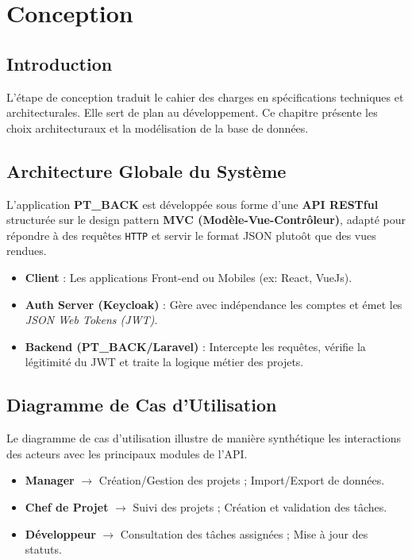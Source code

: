 \chapter{Conception}

\section{Introduction}
L'\'{e}tape de conception traduit le cahier des charges en sp\'{e}cifications techniques
et architecturales. Elle sert de plan au d\'{e}veloppement. Ce chapitre pr\'{e}sente
les choix architecturaux et la mod\'{e}lisation de la base de donn\'{e}es.

\section{Architecture Globale du Syst\`{e}me}

L'application \textbf{PT\_BACK} est d\'{e}velopp\'{e}e sous forme d'une \textbf{API RESTful} structur\'{e}e
sur le design pattern \textbf{MVC (Mod\`{e}le-Vue-Contr\^{o}leur)}, adapt\'{e} pour r\'{e}pondre
\`{a} des requ\^{e}tes \texttt{HTTP} et servir le format JSON pluto\^{o}t que des vues rendues.

\vspace{0.4cm}
\begin{itemize}[leftmargin=*]
    \item \textbf{Client} : Les applications Front-end ou Mobiles (ex: React, VueJs).
    \item \textbf{Auth Server (Keycloak)} : G\`{e}re avec ind\'{e}pendance les comptes
    et \'{e}met les \textit{JSON Web Tokens (JWT)}.
    \item \textbf{Backend (PT\_BACK/Laravel)} : Intercepte les requ\^{e}tes, v\'{e}rifie
    la l\'{e}gitimit\'{e} du JWT et traite la logique m\'{e}tier des projets.
\end{itemize}

\section{Diagramme de Cas d'Utilisation}

Le diagramme de cas d'utilisation illustre de mani\`{e}re synth\'{e}tique les
interactions des acteurs avec les principaux modules de l'API.

\begin{itemize}[leftmargin=*, label=\textcolor{emsiRed}{}]
    \item \textbf{Manager} $\rightarrow$ Cr\'{e}ation/Gestion des projets ; Import/Export de donn\'{e}es.
    \item \textbf{Chef de Projet} $\rightarrow$ Suivi des projets ; Cr\'{e}ation et validation des t\^{a}ches.
    \item \textbf{D\'{e}veloppeur} $\rightarrow$ Consultation des t\^{a}ches assign\'{e}es ; Mise \`{a} jour des statuts.
\end{itemize}

